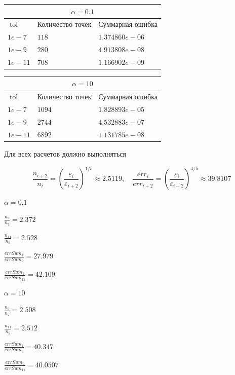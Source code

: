 \documentclass{article}
\DeclareMathOperator{\tol}{tol}
\begin{document}
\begin{tabular}{ |p{3cm}||p{3cm}|p{3cm}|  }
 \hline
 \multicolumn{3}{|c|}{$\alpha = 0.1$} \\
 \hline
 $\tol$ &Количество точек&Суммарная ошибка\\
 \hline
 $1e-7$& $118$ & $1.374860e-06$     \\
 $1e-9$& $280$ & $4.913808e-08$   \\
 $1e-11$ & $708$ & $1.166902e-09$\\

 \hline
\end{tabular}

\begin{tabular}{ |p{3cm}||p{3cm}|p{3cm}|  }
 \hline
 \multicolumn{3}{|c|}{$\alpha = 10$} \\
 \hline
 $\tol$ &Количество точек&Суммарная ошибка\\
 \hline
 $1e-7$& $1094$ & $1.828893e-05$     \\
 $1e-9$& $2744$ & $4.532883e-07$   \\
 $1e-11$ & $6892$ & $1.131785e-08$\\

 \hline
\end{tabular}


Для всех расчетов должно выполняться

$$
\frac{n_{i+2}}{n_{i}}=\left(\frac{\varepsilon_{i}}{\varepsilon_{i+2}}\right)^{1 / 5} \approx 2.5119, \quad \frac{e r r_{i}}{e r r_{i+2}}=\left(\frac{\varepsilon_{i}}{\varepsilon_{i+2}}\right)^{4 / 5} \approx 39.8107
$$

$\alpha = 0.1$

$\frac{n_9}{n_7} = 2.372$

$\frac{n_{11}}{n_9} = 2.528$

$\frac{errSum_7}{errSum_9} = 27.979$

$\frac{errSum_9}{errSum_{11}} = 42.109$


$\alpha = 10$

$\frac{n_9}{n_7} = 2.508$

$\frac{n_{11}}{n_9} = 2.512$

$\frac{errSum_7}{errSum_9} = 40.347$

$\frac{errSum_9}{errSum_{11}} = 40.0507$
\end{document}
